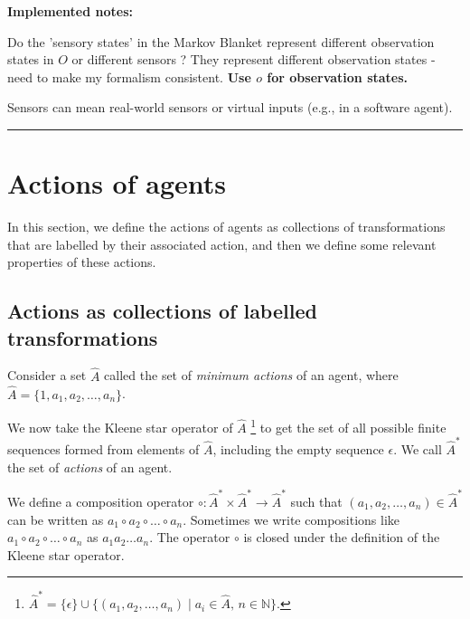 {    \textbf{Implemented notes:}
    \begin{compactitem}
        \item Do the 'sensory states' in the Markov Blanket represent different observation states in $O$ or different sensors ? They represent different observation states - need to make my formalism consistent. \textbf{Use $o$ for observation states.}
        \item Sensors can mean real-world sensors or virtual inputs (e.g., in a software agent).
    \end{compactitem}
    \noindent\rule{\textwidth}{1mm}
}

\section{Actions of agents}

In this section, we define the actions of agents as collections of transformations that are labelled by their associated action, and then we define some relevant properties of these actions.

\subsection{Actions as collections of labelled transformations}

Consider a set $\hat{A}$ called the set of \emph{minimum actions} of an agent, where $\hat{A} = \{1, a_{1}, a_{2}, \dots, a_{n}\}$.

We now take the Kleene star operator of $\hat{A}$ \footnote{
    $\hat{A}^{\ast} = \{ \epsilon \} \cup \{ (a_1, a_2, \dots, a_n) \mid a_i \in \hat{A}, \, n \in \mathbb{N} \}$.
} to get the set of all possible finite sequences formed from elements of $\hat{A}$, including the empty sequence $\epsilon$.
We call $\hat{A}^{\ast}$ the set of \emph{actions} of an agent.

We define a composition operator $\circ: \hat{A}^{\ast} \times \hat{A}^{\ast} \to \hat{A}^{\ast}$ such that $(a_1, a_2, \dots, a_n) \in \hat{A}^{\ast}$ can be written as $a_1 \circ a_2 \circ \dots \circ a_n$.
Sometimes we write compositions like $a_1 \circ a_2 \circ \dots \circ a_n$ as $a_1 a_2 \dots a_n$.
The operator $\circ$ is closed under the definition of the Kleene star operator.

